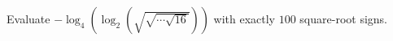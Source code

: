 Evaluate $-\log_4\left(\log_2\left(\sqrt{\sqrt{\cdots\sqrt{16}}}\right)\right)$ with exactly $100$ square-root signs.
